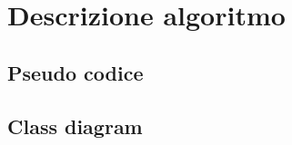 \def\baselinestretch{1}
\section{Descrizione algoritmo}
\def\baselinestretch{1.66}
\thispagestyle{headings}

\subsection{Pseudo codice}

\subsection{Class diagram}